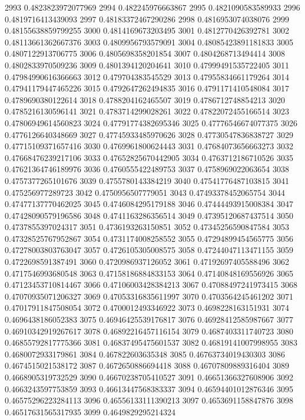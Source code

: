 2993 0.4823823972077969
2994 0.482245976663867
2995 0.4821090583589933
2996 0.4819716413439093
2997 0.48183372467290286
2998 0.4816953074038076
2999 0.48155638859799255
3000 0.4814169673203495
3001 0.4812770426392781
3002 0.48113661362667376
3003 0.4809956793579091
3004 0.48085423891181833
3005 0.4807122913706775
3006 0.4805698358201854
3007 0.4804268713494414
3008 0.4802833970509236
3009 0.4801394120204641
3010 0.47999491535722405
3011 0.47984990616366663
3012 0.479704383545529
3013 0.47955834661179264
3014 0.47941179447465226
3015 0.4792647262494835
3016 0.4791171410548084
3017 0.4789690380122614
3018 0.4788204162465507
3019 0.4786712748854213
3020 0.4785216130596141
3021 0.4783714299028261
3022 0.47822072455166514
3023 0.47806949614560823
3024 0.47791774382695346
3025 0.47776546674077375
3026 0.4776126640348669
3027 0.47745933485970626
3028 0.47730547836838727
3029 0.47715109371657416
3030 0.4769961800624443
3031 0.47684073656663273
3032 0.47668476239217106
3033 0.47652825670442905
3034 0.4763712186710526
3035 0.47621364746189976
3036 0.4760555422489753
3037 0.4758969022063654
3038 0.4757377265101676
3039 0.4755780143384219
3040 0.47541776487103815
3041 0.475256977289723
3042 0.4750956507779051
3043 0.47493378452065754
3044 0.47477137770462025
3045 0.4746084295179188
3046 0.47444493915008384
3047 0.47428090579196586
3048 0.4741163286356514
3049 0.47395120687437514
3050 0.4737855397024317
3051 0.4736193263150851
3052 0.47345256590847584
3053 0.47328525767952867
3054 0.4731174008258552
3055 0.47294899454565775
3056 0.47278003803763047
3057 0.4726105305008575
3058 0.47244047113471155
3059 0.4722698591387491
3060 0.4720986937126052
3061 0.47192697405588496
3062 0.4717546993680548
3063 0.47158186884833153
3064 0.47140848169556926
3065 0.47123453710814467
3066 0.47106003428384213
3067 0.47088497241973415
3068 0.47070935071206327
3069 0.47053316835611997
3070 0.4703564245461202
3071 0.47017911847508054
3072 0.4700012493346922
3073 0.4698228163151931
3074 0.4696438186052383
3075 0.46946425539176817
3076 0.46928412585987667
3077 0.46910342919267617
3078 0.46892216457116154
3079 0.4687403311740723
3080 0.46855792817775366
3081 0.46837495475601537
3082 0.46819141007998955
3083 0.4680072933179861
3084 0.467822603635348
3085 0.46763734019430303
3086 0.4674515021538172
3087 0.4672650886694418
3088 0.46707809889316404
3089 0.4668905319732529
3090 0.46670238705410527
3091 0.46651366327608906
3092 0.4663243597753859
3093 0.46613447568383337
3094 0.46594401012876346
3095 0.46575296223284113
3096 0.46556133111390213
3097 0.4653691158847876
3098 0.46517631565317935
3099 0.4649829295214324
